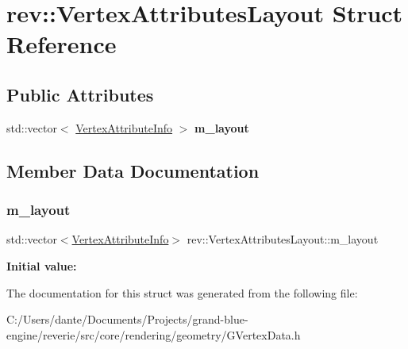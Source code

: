 \hypertarget{structrev_1_1_vertex_attributes_layout}{}\section{rev\+::Vertex\+Attributes\+Layout Struct Reference}
\label{structrev_1_1_vertex_attributes_layout}
\subsection*{Public Attributes}
\begin{DoxyCompactItemize}
\item 
std\+::vector$<$ \mbox{\hyperlink{structrev_1_1_vertex_attribute_info}{Vertex\+Attribute\+Info}} $>$ {\bfseries m\+\_\+layout}
\end{DoxyCompactItemize}


\subsection{Member Data Documentation}
\mbox{\label{structrev_1_1_vertex_attributes_layout_a74c1f465d057b9f41829a975c7ab8790}} 
\subsubsection{\texorpdfstring{m\_layout}{m\_layout}}
{\footnotesize\ttfamily std\+::vector$<$\mbox{\hyperlink{structrev_1_1_vertex_attribute_info}{Vertex\+Attribute\+Info}}$>$ rev\+::\+Vertex\+Attributes\+Layout\+::m\+\_\+layout}

{\bfseries Initial value\+:}
\begin{DoxyCode}{0}
\DoxyCodeLine{= \{ }
\DoxyCodeLine{    \}}

\end{DoxyCode}


The documentation for this struct was generated from the following file\+:\begin{DoxyCompactItemize}
\item 
C\+:/\+Users/dante/\+Documents/\+Projects/grand-\/blue-\/engine/reverie/src/core/rendering/geometry/G\+Vertex\+Data.\+h\end{DoxyCompactItemize}
